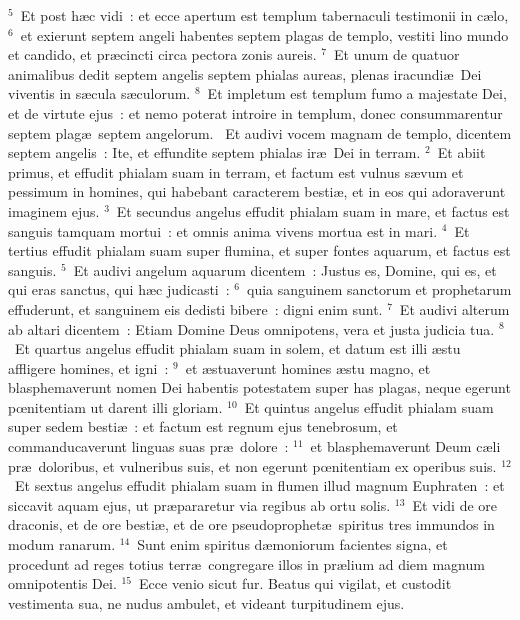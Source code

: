 ${}^{5}$~Et post h\ae c vidi~: et ecce apertum est templum tabernaculi testimonii in c\ae lo,
${}^{6}$~et exierunt septem angeli habentes septem plagas de templo, vestiti lino mundo et candido, et pr\ae cincti circa pectora zonis aureis.
${}^{7}$~Et unum de quatuor animalibus dedit septem angelis septem phialas aureas, plenas iracundi\ae\ Dei viventis in s\ae cula s\ae culorum.
${}^{8}$~Et impletum est templum fumo a majestate Dei, et de virtute ejus~: et nemo poterat introire in templum, donec consummarentur septem plag\ae\ septem angelorum.
~\lettrine[lines=10,image=true,loversize=0.05,lraise=-0.03]{E}{}t audivi vocem magnam de templo, dicentem septem angelis~: Ite, et effundite septem phialas ir\ae\ Dei in terram.
${}^{2}$~Et abiit primus, et effudit phialam suam in terram, et factum est vulnus s\ae vum et pessimum in homines, qui habebant caracterem besti\ae , et in eos qui adoraverunt imaginem ejus.
${}^{3}$~Et secundus angelus effudit phialam suam in mare, et factus est sanguis tamquam mortui~: et omnis anima vivens mortua est in mari.
${}^{4}$~Et tertius effudit phialam suam super flumina, et super fontes aquarum, et factus est sanguis.
${}^{5}$~Et audivi angelum aquarum dicentem~: Justus es, Domine, qui es, et qui eras sanctus, qui h\ae c judicasti~:
${}^{6}$~quia sanguinem sanctorum et prophetarum effuderunt, et sanguinem eis dedisti bibere~: digni enim sunt.
${}^{7}$~Et audivi alterum ab altari dicentem~: Etiam Domine Deus omnipotens, vera et justa judicia tua.
${}^{8}$~Et quartus angelus effudit phialam suam in solem, et datum est illi \ae stu affligere homines, et igni~:
${}^{9}$~et \ae stuaverunt homines \ae stu magno, et blasphemaverunt nomen Dei habentis potestatem super has plagas, neque egerunt pœnitentiam ut darent illi gloriam.
${}^{10}$~Et quintus angelus effudit phialam suam super sedem besti\ae~: et factum est regnum ejus tenebrosum, et commanducaverunt linguas suas pr\ae\ dolore~:
${}^{11}$~et blasphemaverunt Deum c\ae li pr\ae\ doloribus, et vulneribus suis, et non egerunt pœnitentiam ex operibus suis.
${}^{12}$~Et sextus angelus effudit phialam suam in flumen illud magnum Euphraten~: et siccavit aquam ejus, ut pr\ae pararetur via regibus ab ortu solis.
${}^{13}$~Et vidi de ore draconis, et de ore besti\ae , et de ore pseudoprophet\ae\ spiritus tres immundos in modum ranarum.
${}^{14}$~Sunt enim spiritus d\ae moniorum facientes signa, et procedunt ad reges totius terr\ae\ congregare illos in pr\ae lium ad diem magnum omnipotentis Dei.
${}^{15}$~Ecce venio sicut fur. Beatus qui vigilat, et custodit vestimenta sua, ne nudus ambulet, et videant turpitudinem ejus.
